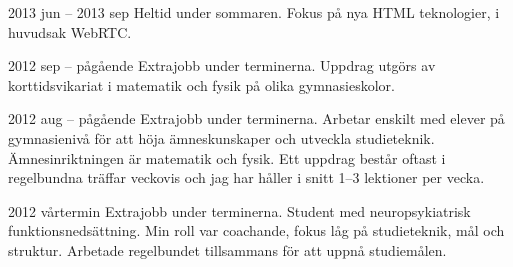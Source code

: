 
      {2013 jun -- 2013 sep}
      {Heltid under sommaren. Fokus på nya HTML teknologier, i
       huvudsak WebRTC.}

      {2012 sep -- pågående}
      {Extrajobb under terminerna. Uppdrag utgörs av korttidsvikariat
       i matematik och fysik på olika gymnasieskolor.}

      {2012 aug -- pågående}
      {Extrajobb under terminerna. Arbetar enskilt med elever på
       gymnasienivå för att höja ämneskunskaper och utveckla
       studieteknik. Ämnesinriktningen är matematik och fysik. Ett
       uppdrag består oftast i regelbundna träffar veckovis och jag
       har håller i snitt 1--3 lektioner per vecka.}

      {2012 vårtermin}
      {Extrajobb under terminerna. Student med neuropsykiatrisk
       funktionsnedsättning. Min roll var coachande, fokus låg på
       studieteknik, mål och struktur. Arbetade regelbundet
       tillsammans för att uppnå studiemålen.}
